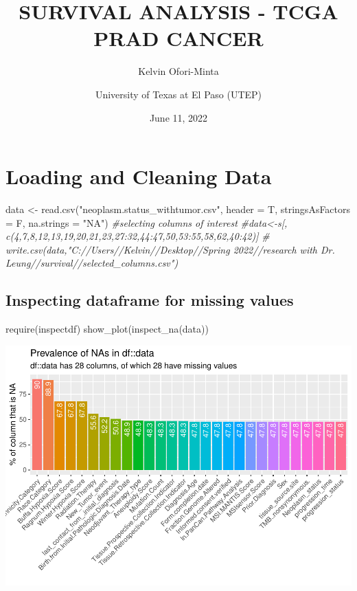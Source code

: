 \documentclass[
  11pt,
]{article}
\title{SURVIVAL ANALYSIS - TCGA PRAD CANCER}
\author{Kelvin Ofori-Minta \and University of Texas at El Paso (UTEP)}
\date{June 11, 2022}
\newenvironment{Shaded}{\begin{snugshade}}{\end{snugshade}}
\newcommand{\AttributeTok}[1]{\textcolor[rgb]{0.77,0.63,0.00}{#1}}
\newcommand{\CommentTok}[1]{\textcolor[rgb]{0.56,0.35,0.01}{\textit{#1}}}
\newcommand{\FunctionTok}[1]{\textcolor[rgb]{0.00,0.00,0.00}{#1}}
\newcommand{\NormalTok}[1]{#1}
\newcommand{\OtherTok}[1]{\textcolor[rgb]{0.56,0.35,0.01}{#1}}
\newcommand{\StringTok}[1]{\textcolor[rgb]{0.31,0.60,0.02}{#1}}
\begin{document}
\maketitle

{
\setcounter{tocdepth}{4}
\tableofcontents
}
\newpage
\section{Loading and Cleaning Data}

\begin{Shaded}
\begin{Highlighting}[]
\NormalTok{data }\OtherTok{\textless{}{-}} \FunctionTok{read.csv}\NormalTok{(}\StringTok{"neoplasm.status\_withtumor.csv"}\NormalTok{, }\AttributeTok{header =}\NormalTok{ T, }\AttributeTok{stringsAsFactors =}\NormalTok{ F,}
              \AttributeTok{na.strings =} \StringTok{"NA"}\NormalTok{)}
\CommentTok{\#selecting columns of interest}
\CommentTok{\#data\textless{}{-}s[, c(4,7,8,12,13,19,20,21,23,27:32,44:47,50,53:55,58,62,40:42)]}
\CommentTok{\# write.csv(data,"C://Users//Kelvin//Desktop//Spring 2022//research with Dr. Leung//survival//selected\_columns.csv")}
\end{Highlighting}
\end{Shaded}

\subsection{Inspecting dataframe for missing values}

\begin{Shaded}
\begin{Highlighting}[]
\FunctionTok{require}\NormalTok{(inspectdf)}
\FunctionTok{show\_plot}\NormalTok{(}\FunctionTok{inspect\_na}\NormalTok{(data))}
\end{Highlighting}
\end{Shaded}

\includegraphics{new_surv_2_files/figure-latex/unnamed-chunk-2-1.pdf}
\end{document}
